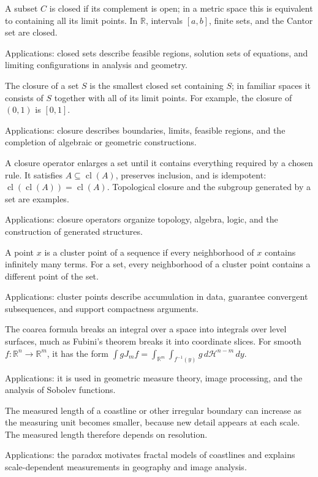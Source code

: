 A subset $C$ is closed if its complement is open; in a metric space this is equivalent to containing all its limit points. In $\mathbb R$, intervals $[a,b]$, finite sets, and the Cantor set are closed. \par\noindent Applications: closed sets describe feasible regions, solution sets of equations, and limiting configurations in analysis and geometry.

The closure of a set $S$ is the smallest closed set containing $S$; in familiar spaces it consists of $S$ together with all of its limit points. For example, the closure of $(0,1)$ is $[0,1]$. \par\noindent Applications: closure describes boundaries, limits, feasible regions, and the completion of algebraic or geometric constructions.

A closure operator enlarges a set until it contains everything required by a chosen rule. It satisfies $A\subseteq\operatorname{cl}(A)$, preserves inclusion, and is idempotent: $\operatorname{cl}(\operatorname{cl}(A))=\operatorname{cl}(A)$. Topological closure and the subgroup generated by a set are examples. \par\noindent Applications: closure operators organize topology, algebra, logic, and the construction of generated structures.

A point $x$ is a cluster point of a sequence if every neighborhood of $x$ contains infinitely many terms. For a set, every neighborhood of a cluster point contains a different point of the set. \par\noindent Applications: cluster points describe accumulation in data, guarantee convergent subsequences, and support compactness arguments.

The coarea formula breaks an integral over a space into integrals over level surfaces, much as Fubini's theorem breaks it into coordinate slices. For smooth $f:\mathbb R^n\to\mathbb R^m$, it has the form $\int gJ_mf=\int_{\mathbb R^m}\int_{f^{-1}(y)}g\,d\mathcal H^{n-m}\,dy$. \par\noindent Applications: it is used in geometric measure theory, image processing, and the analysis of Sobolev functions.

The measured length of a coastline or other irregular boundary can increase as the measuring unit becomes smaller, because new detail appears at each scale. The measured length therefore depends on resolution. \par\noindent Applications: the paradox motivates fractal models of coastlines and explains scale-dependent measurements in geography and image analysis.

